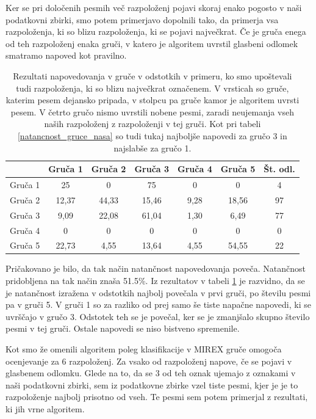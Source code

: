 \documentclass[a4paper, 12pt]{book}
\begin{document}
{Ker se pri določenih pesmih več razpoloženj pojavi skoraj enako pogosto v naši podatkovni zbirki, smo potem primerjavo dopolnili tako, da primerja vsa razpoloženja, ki so blizu razpoloženja, ki se pojavi največkrat. Če je gruča enega od teh razpoloženj enaka gruči, v katero je algoritem uvrstil glasbeni odlomek smatramo napoved kot pravilno. 

\begin{table}[htb]
\begin{center}
\caption{Rezultati napovedovanja v gruče v odstotkih v primeru, ko smo upoštevali tudi razpoloženja, ki so blizu največkrat označenem. V vrsticah so gruče, katerim pesem dejansko pripada, v stolpcu pa gruče kamor je algoritem uvrsti pesem. V četrto gručo nismo uvrstili nobene pesmi, zaradi neujemanja vseh naših razpoloženj z razpoloženji v tej gruči. Kot pri tabeli \ref{natancnost_gruce_nasa} so tudi tukaj najboljše napovedi za gručo 3 in najslabše za gručo 1. }
\begin{tabular}{|l|c|c|c|c|c|c|}
\hline
 & Gruča 1 & Gruča 2 & Gruča 3 & Gruča 4 & Gruča 5 & Št. odl.\\ \hline
Gruča 1 & 25 & 0	& 75 & 0 & 0 & 4\\ \hline
Gruča 2 & 12,37 & 44,33 & 15,46 & 9,28 & 18,56 & 97\\ \hline
Gruča 3 & 9,09 & 22,08 & 61,04 & 1,30 & 6,49 & 77\\ \hline
Gruča 4 & 0	& 0 & 0 & 0 & 0 & 0\\ \hline
Gruča 5 & 22,73	& 4,55 & 13,64 & 4,55 & 54,55 & 22 \\ \hline

\hline
\end{tabular}
\label{natancnost_gruce_nasa_with_second}
\end{center}
\end{table}

Pričakovano je bilo, da tak način natančnost napovedovanja poveča. Natančnost pridobljena na tak način znaša 51.5\%. Iz rezultatov v tabeli \ref{natancnost_gruce_nasa_with_second} je razvidno, da se je natančnost izražena v odstotkih najbolj povečala v prvi gruči, po številu pesmi pa v gruči 5. V gruči 1 so za razliko od prej samo še tiste napačne napovedi, ki se uvrščajo v gručo 3. Odstotek teh se je povečal, ker se je zmanjšalo skupno število pesmi v tej gruči. Ostale napovedi se niso bistveno spremenile. 

Kot smo že omenili algoritem poleg klasifikacije v MIREX gruče omogoča ocenjevanje za 6 razpoloženj. Za vsako od razpoloženj napove, če se pojavi v glasbenem odlomku. Glede na to, da se 3 od teh oznak ujemajo z oznakami v naši podatkovni zbirki, sem iz podatkovne zbirke vzel tiste pesmi, kjer je je to razpoloženje najbolj prisotno od vseh. Te pesmi sem potem primerjal z rezultati, ki jih vrne algoritem. 

}
\end{document}
